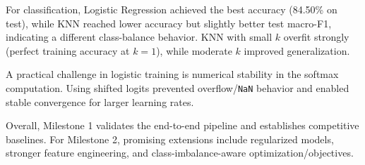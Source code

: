 \documentclass[10pt, twocolumn, letterpaper]{article}
\begin{document}
For classification, Logistic Regression achieved the best accuracy (84.50\% on test), while KNN reached lower accuracy but slightly better test macro-F1, indicating a different class-balance behavior. KNN with small $k$ overfit strongly (perfect training accuracy at $k=1$), while moderate $k$ improved generalization.

A practical challenge in logistic training is numerical stability in the softmax computation. Using shifted logits prevented overflow/\texttt{NaN} behavior and enabled stable convergence for larger learning rates.

Overall, Milestone 1 validates the end-to-end pipeline and establishes competitive baselines. For Milestone 2, promising extensions include regularized models, stronger feature engineering, and class-imbalance-aware optimization/objectives.
\end{document}
